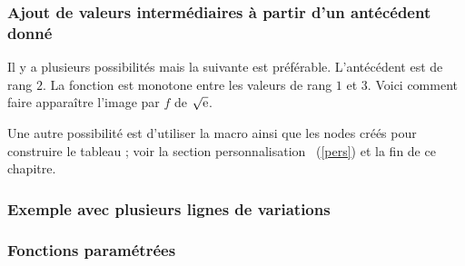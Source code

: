 \subsubsection{Ajout de valeurs intermédiaires à partir d'un antécédent donné}
Il y a plusieurs  possibilités mais la suivante est préférable. L'antécédent est de rang $2$.
 La fonction est monotone entre les valeurs de rang $1$ et $3$. Voici comment faire apparaître l'image par $f$ de $\sqrt{\mathrm{e}}$.

\begin{tkzexample}
\end{tkzexample}  

Une autre possibilité est d'utiliser la macro  ainsi que les nodes créés pour construire le tableau ;  voir la section \og personnalisation \fg\ (\ref{pers}) et la fin de ce chapitre. 

\subsubsection{Exemple avec plusieurs lignes de variations}
\begin{tkzexample}
\end{tkzexample}


\subsubsection{Fonctions paramétrées}

